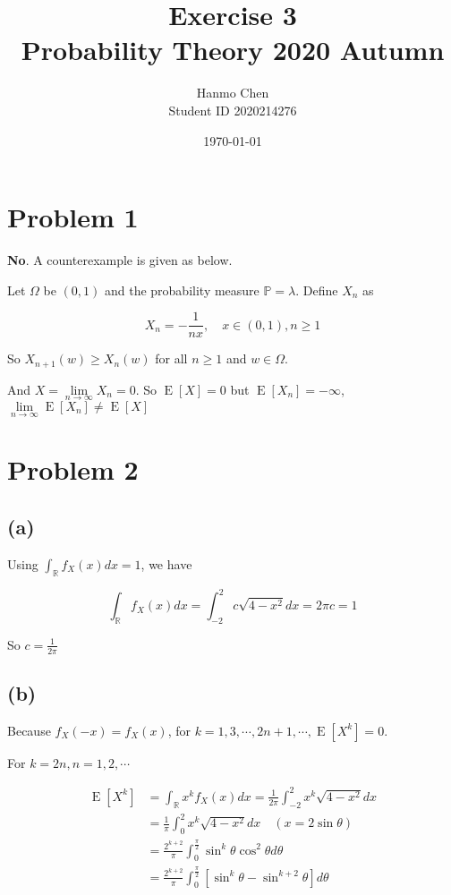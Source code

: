 \documentclass{article}
\title{Exercise 3 \\ Probability Theory 2020 Autumn}
\author{Hanmo Chen \\ Student ID 2020214276}
\date{\today}
\begin{document}
\maketitle
\tableofcontents
\newpage

\section{Problem 1}

\textbf{No}. A counterexample is given as below.

Let $\Omega$ be $(0,1)$ and the probability measure $\mathbb{P} = \lambda$. Define $X_n$ as

\begin{equation}
    X_n = -\frac{1}{nx}, \quad x \in (0,1), n\geqslant 1
\end{equation}

So $X_{n+1}(w) \geqslant X_n(w)$ for all $n \geqslant 1$ and  $w\in \Omega$.

And $X = \lim\limits_{n\to\infty} X_n = 0$. So $\operatorname{E}[X] = 0$ but $\operatorname{E}[X_n] = -\infty$, $\lim\limits_{n\to\infty} \operatorname{E}[X_n] \neq \operatorname{E}[X]$

\section{Problem 2}

\subsection{(a)}

Using $\int_{\mathbb{R}} f_X(x)dx =1$, we have

\begin{equation}
    \int_{\mathbb{R}} f_X(x)dx = \int_{-2}^2 c\sqrt{4-x^2}dx = 2\pi c = 1
\end{equation}

So $c = \frac{1}{2\pi}$

\subsection{(b)}

Because $f_X(-x) = f_X(x)$, for $k=1,3,\cdots,2n+1,\cdots,  \operatorname{E}[X^k] = 0$.

For $k=2n,n=1,2,\cdots$

\begin{equation}
    \begin{aligned}
        \operatorname{E}[X^k] & =  \int_{\mathbb{R}} x^kf_X(x)dx =  \frac 1 {2\pi} \int_{-2}^2 x^k\sqrt{4-x^2} dx \\ 
        & =  \frac {1}{\pi} \int_{0}^{2}x^k\sqrt{4-x^2} dx \quad(x=2\sin\theta) \\
        & = \frac {2^{k+2}}{\pi}\int_{0}^{\frac \pi {2}}{\sin^k\theta \cos^2\theta} d\theta \\
        & = \frac {2^{k+2}}{\pi}\int_{0}^{\frac \pi {2}} \left[\sin^k\theta  - \sin^{k+2}\theta \right] d\theta
    \end{aligned}
\end{equation}
\end{document}
